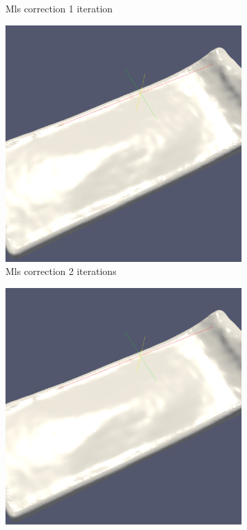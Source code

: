 \begin{figure}
\begin{center}
\begin{subfigure}[b]{0.47\textwidth}
			\caption{Mls correction 1 iteration}
		\end{subfigure}
		\begin{subfigure}[b]{0.47\textwidth}
			\includegraphics[width=\textwidth]{figures/Mls2Surface2Iteration.png}
			\caption{Mls correction 2 iterations}
		\end{subfigure}
		\begin{subfigure}[b]{0.47\textwidth}
			\includegraphics[width=\textwidth]{figures/Mls2Surface3Iteration.png}

\end{subfigure}
\end{center}
\end{figure}
